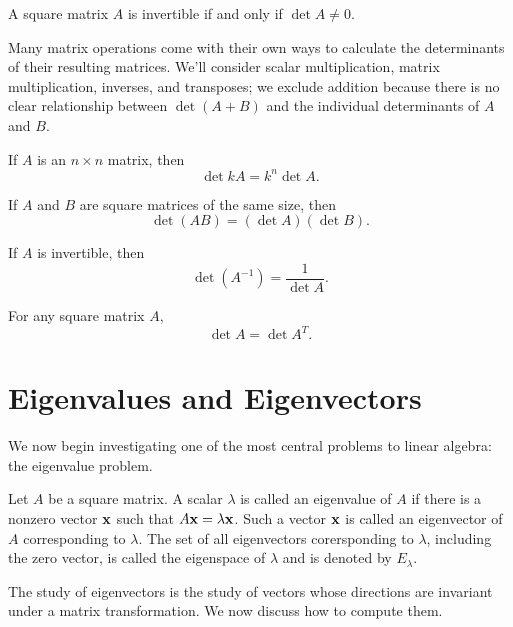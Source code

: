 \documentclass[../m73main.tex]{chapters}
\begin{document}
\begin{theorem}
	A square matrix $A$ is invertible if and only if $\det A \neq 0$.
\end{theorem}

Many matrix operations come with their own ways to calculate the determinants of their resulting matrices.
We'll consider scalar multiplication, matrix multiplication, inverses, and transposes; we exclude addition because there is no clear relationship between $\det (A + B)$ and the individual determinants of $A$ and $B$.

\begin{theorem}
	If $A$ is an $n \times n$ matrix, then
	\[ \det kA = k^n \det A. \]
\end{theorem}

\begin{theorem}
	If $A$ and $B$ are square matrices of the same size, then
	\[ \det (AB) = (\det A)(\det B). \]
\end{theorem}

\begin{theorem}
	If $A$ is invertible, then
	\[ \det (A^{-1}) = \frac{1}{\det A}. \]
\end{theorem}

\begin{theorem}
	For any square matrix $A$,
	\[ \det A = \det A^T. \]
\end{theorem}

\section{Eigenvalues and Eigenvectors}
We now begin investigating one of the most central problems to linear algebra: the eigenvalue problem.

\begin{definition}
	Let $A$ be a square matrix.
	A scalar $\lambda$ is called an eigenvalue of $A$ if there is a nonzero vector $\mathbf{x}$ such that $A \mathbf{x} = \lambda \mathbf{x}$.
	Such a vector $\mathbf{x}$ is called an eigenvector of $A$ corresponding to $\lambda$.
	The set of all eigenvectors corersponding to $\lambda$, including the zero vector, is called the eigenspace of $\lambda$ and is denoted by $E_\lambda$.
\end{definition}

The study of eigenvectors is the study of vectors whose directions are invariant under a matrix transformation.
We now discuss how to compute them.
\end{document}
